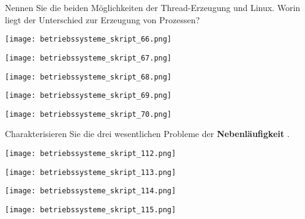 \documentclass{article}
\begin{document}
\begin{tcolorbox}[colback=white!10!white,colframe=lightgray!75!black,
  savelowerto=\jobname_ex.tex,breakable,enhanced,lines before break=40]

\begin{center}
Nennen Sie die beiden Möglichkeiten der Thread-Erzeugung und Linux. 
Worin liegt der Unterschied zur Erzeugung von Prozessen?

\end{center}

\tcblower

\justifying
\begin{center}
\texttt{[image: betriebssysteme\_skript\_66.png]}
\end{center}
\begin{center}
\texttt{[image: betriebssysteme\_skript\_67.png]}
\end{center}
\begin{center}
\texttt{[image: betriebssysteme\_skript\_68.png]}
\end{center}
\begin{center}
\texttt{[image: betriebssysteme\_skript\_69.png]}
\end{center}
\begin{center}
\texttt{[image: betriebssysteme\_skript\_70.png]}
\end{center}

\end{tcolorbox}
\begin{tcolorbox}[colback=white!10!white,colframe=lightgray!75!black,
  savelowerto=\jobname_ex.tex,breakable,enhanced,lines before break=40]

\begin{center}
Charakterisieren Sie die drei wesentlichen Probleme der 
\textbf{Nebenläufigkeit
}.

\end{center}

\tcblower

\justifying
\begin{center}
\texttt{[image: betriebssysteme\_skript\_112.png]}
\end{center}
\begin{center}
\texttt{[image: betriebssysteme\_skript\_113.png]}
\end{center}
\begin{center}
\texttt{[image: betriebssysteme\_skript\_114.png]}
\end{center}
\begin{center}
\texttt{[image: betriebssysteme\_skript\_115.png]}
\end{center}

\end{tcolorbox}
\end{document}
